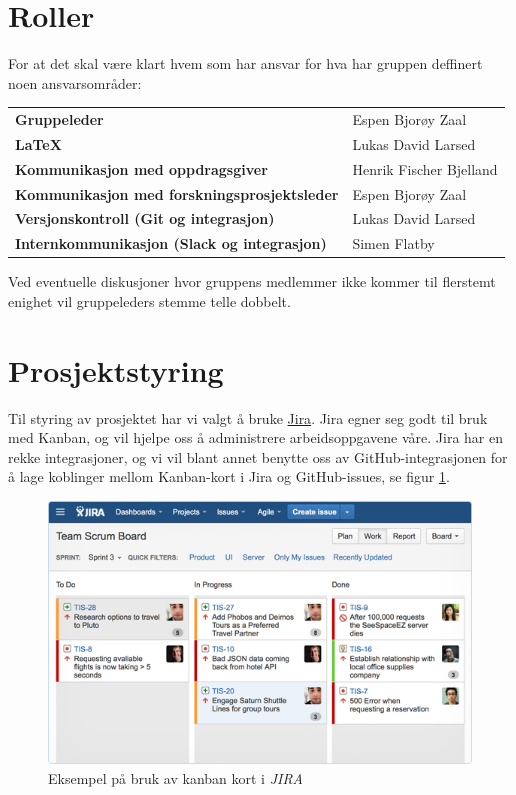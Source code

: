\section{Roller}
For at det skal være klart hvem som har ansvar for hva har gruppen deffinert noen ansvarsområder:
\begin{flushleft}
\renewcommand{\arraystretch}{1.5}
\begin{tabular}[ht]{@{}ll@{}}
\textbf{Gruppeleder} & Espen Bjorøy Zaal \\
\textbf{\LaTeX} & Lukas David Larsed \\
\textbf{Kommunikasjon med oppdragsgiver} & Henrik Fischer Bjelland \\
\textbf{Kommunikasjon med forskningsprosjektsleder} & Espen Bjorøy Zaal \\
\textbf{Versjonskontroll (Git og integrasjon)} & Lukas David Larsed \\
\textbf{Internkommunikasjon (Slack og integrasjon)} & Simen Flatby \\
\end{tabular} 
\end{flushleft}
Ved eventuelle diskusjoner hvor gruppens medlemmer ikke kommer til flerstemt enighet vil gruppeleders stemme telle dobbelt.

\section{Prosjektstyring}
Til styring av prosjektet har vi valgt å bruke \href{https://www.atlassian.com/software/jira}{Jira}. Jira egner seg godt til bruk med Kanban, og vil hjelpe oss å administrere arbeidsoppgavene våre. Jira har en rekke integrasjoner, og vi vil blant annet benytte oss av GitHub-integrasjonen for å lage koblinger mellom Kanban-kort i Jira og GitHub-issues, se figur \ref{fig:jira}.
\cleardoublepage
\begin{figure}[ht]
\centering
\includegraphics[width=\textwidth, keepaspectratio]{./img/arbeidsmetodikk/jira_kanban.png}
\caption{Eksempel på bruk av kanban kort i \emph{JIRA}}
\label{fig:jira}
\end{figure}
